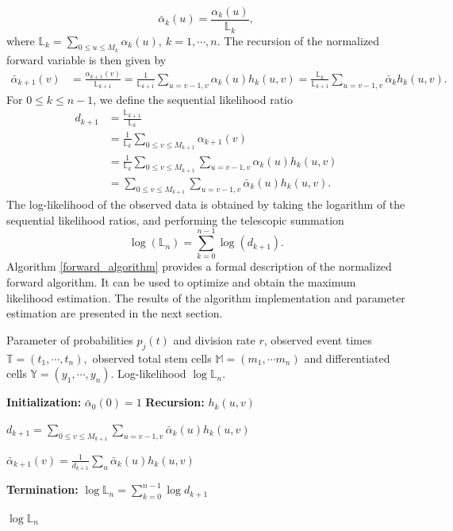\documentclass[pdflatex,sn-mathphys-num]{sn-jnl}
\theoremstyle{thmstyleone}%
\theoremstyle{thmstyletwo}%
\theoremstyle{thmstylethree}%
\newcommand{\LL}{\mathbb{L}}
\begin{document}
$$\bar{\alpha}_k(u) = \frac{\alpha_k(u)}{\LL_k},$$
where $\LL_k = \displaystyle\sum_{0 \leq u \leq M_k} \alpha_k (u), \ k=1, \cdots, n$. The recursion of the normalized forward variable is then given by
\begin{equation}
    \begin{split}
        \bar{\alpha}_{k+1}(v) & = \frac{\alpha_{k+1} (v)}{\LL_{k+1}} =\frac{1}{\LL_{k+1}} \sum_{u = v-1,v} \alpha_k(u) h_k(u,v) = \frac{\LL_k}{\LL_{k+1}} \sum_{u = v-1,v} \bar{\alpha}_k h_k(u,v).
    \end{split}
\end{equation}
For $0 \leq k \leq n-1$, we define the sequential likelihood ratio
\begin{equation}
    \begin{split}
        d_{k+1} & = \frac{\LL_{k+1}}{\LL_k} \\
        & = \frac{1}{\LL_k} \sum_{0 \leq v\leq M_{k+1}} \alpha_{k+1}(v) \\
        & = \frac{1}{\LL_k} \sum_{0 \leq v \leq M_{k+1}} \sum_{u = v-1, v} \alpha_k(u) h_k (u,v)\\
        & = \sum_{0\leq v\leq M_{k+1}} \sum_{u=v-1,v} \bar{\alpha}_k(u) h_k(u,v).
    \end{split}
\end{equation}
The log-likelihood of the observed data is obtained by taking the logarithm of the sequential likelihood ratios, and performing the telescopic summation
$$\log(\LL_n)=\sum_{k=0}^{n-1}  \log(d_{k+1}).$$
Algorithm \ref{forward_algorithm} provides a formal description of the normalized forward algorithm. It can be used to optimize and obtain the maximum likelihood estimation. The results of the algorithm implementation and parameter estimation are presented in the next section.

\begin{algorithm}
\caption{Normalized Forward Algorithm to Compute Log-likelihood ($\log \mathbb{L}_n$)}
\begin{algorithmic}[1]
\Require
Parameter of probabilities $p_j(t)$ and division rate $r$, observed event times $\mathbb{T} = (t_1, \cdots, t_n),$ observed total stem cells $\mathbb{M} = (m_1, \cdots m_n)$ and differentiated cells $\mathbb{Y} = (y_1, \cdots, y_n)$.
\Ensure Log-likelihood $\log \mathbb{L}_n$.

\Statex \textbf{Initialization:}
    \State $\bar{\alpha}_0(0) = 1$
\Statex \textbf{Recursion:}
        \State $h_k(u,v)$
    \EndFor

    \State $d_{k+1}
    = \displaystyle\sum_{0\leq v\leq M_{k+1}} \sum_{u=v-1,v} \bar{\alpha}_k(u) h_k(u,v)$

        \State $\bar{\alpha}_{k+1}(v)
        = \frac{1}{d_{k+1}}
        \displaystyle\sum_{u} \bar{\alpha}_k(u) h_k(u,v)$
    \EndFor
\EndFor

\Statex \textbf{Termination:}
\State $\log \mathbb{L}_n
    = \displaystyle\sum_{k=0}^{n-1} \log d_{k+1}$

\State \Return $\log \mathbb{L}_n$

\end{algorithmic}
\label{forward_algorithm}
\end{algorithm}
\end{document}
